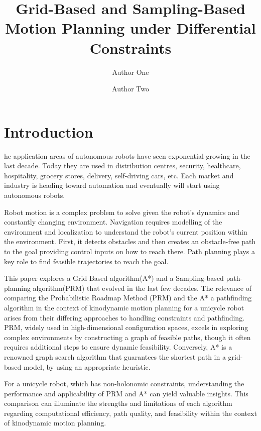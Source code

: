 \documentclass[9pt,a4paper,twoside]{rho-class/rho}
\title{Grid-Based and Sampling-Based Motion Planning under
Differential Constraints}
\author[1]{Author One}
\author[2]{Author Two}
\affil[1]{\Large Ahnaf Ojayer - 2121949642}
\affil[2]{\Large Maisha Subha - 2111925042}
\affil[$\dagger$]{\large These authors contributed equally to this work}
\begin{document}
	
    \maketitle
    \thispagestyle{firststyle}


\section{Introduction}

    he application areas of autonomous robots have seen exponential growing in the last decade. Today they are used in distribution centres, security, healthcare, hospitality, grocery stores, delivery, self-driving cars, etc. Each market and industry is heading toward automation and eventually will start using autonomous robots. 
    
    Robot motion is a complex problem to solve given the robot’s dynamics and constantly changing environment. Navigation requires modelling of the environment and localization to understand the robot’s current position within the environment. First, it detects obstacles and then creates an obstacle-free path to the goal providing control inputs on how to reach there. Path planning plays a key role to find feasible trajectories to reach the goal.
    
    This paper explores a Grid Based algorithm(A*) and a Sampling-based path-planning algorithm(PRM) that evolved in the last few decades. The relevance of comparing the Probabilistic Roadmap Method (PRM) and the A* a pathfinding algorithm in the context of kinodynamic motion planning for a unicycle robot arises from their differing approaches to handling constraints and pathfinding. PRM, widely used in high-dimensional configuration spaces, excels in exploring complex environments by constructing a graph of feasible paths, though it often requires additional steps to ensure dynamic feasibility. Conversely, A* is a renowned graph search algorithm that guarantees the shortest path in a grid-based model, by using an appropriate heuristic.
    
    For a unicycle robot, which has non-holonomic constraints, understanding the performance and applicability of PRM and A* can yield valuable insights. This comparison can illuminate the strengths and limitations of each algorithm regarding computational efficiency, path quality, and feasibility within the context of kinodynamic motion planning.
\end{document}
